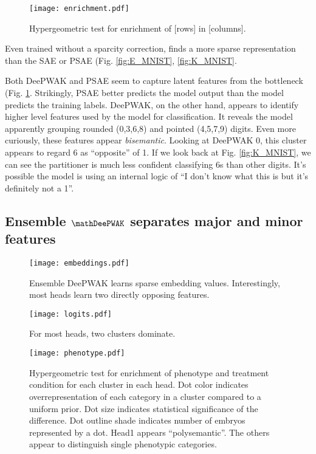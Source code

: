 \begin{figure}
  \texttt{[image: enrichment.pdf]}
    \caption{Hypergeometric test for enrichment of [rows] in [columns].}
    \label{fig:hyperMNIST}
\end{figure}

Even trained without a sparcity correction, \DeePWAK finds a more sparse representation than the SAE or PSAE (Fig. \ref{fig:E_MNIST}, \ref{fig:K_MNIST}.

Both DeePWAK and PSAE seem to capture latent features from the bottleneck (Fig. \ref{fig:hyperMNIST}.
Strikingly, PSAE better predicts the model output than the model predicts the training labels.
DeePWAK, on the other hand, appears to identify higher level features used by the model for classification.
It reveals the model apparently grouping rounded (0,3,6,8) and pointed (4,5,7,9) digits. 
Even more curiously, these features appear \textit{bisemantic}.
Looking at \textsf{DeePWAK 0}, this cluster appears to regard 6 as ``opposite'' of 1.
If we look back at Fig. \ref{fig:K_MNIST}, we can see the partitioner is much less confident classifying 6s than other digits.
It's possible the model is using an internal logic of ``I don't know what this is but it's definitely not a 1''.

\subsection{Ensemble $\mathDeePWAK$ separates major and minor features}

\begin{figure}
  \texttt{[image: embeddings.pdf]}
    \caption{Ensemble DeePWAK learns sparse embedding values. Interestingly, most heads learn two directly opposing features.}
    \label{fig:blockE}
\end{figure}

    
\begin{figure}
  \texttt{[image: logits.pdf]}
  \caption{For most heads, two clusters dominate.}
  \label{fig:blockK}
\end{figure}

\begin{figure}
  \texttt{[image: phenotype.pdf]}
  \caption{Hypergeometric test for enrichment of phenotype and treatment condition for each cluster in each head. Dot color indicates overrepresentation of each category in a cluster compared to a uniform prior. Dot size indicates statistical significance of the difference. Dot outline shade indicates number of embryos represented by a dot. \textsf{Head1} appears ``polysemantic''. The others appear to distinguish single phenotypic categories.}
  \label{fig:hyper}
\end{figure}

